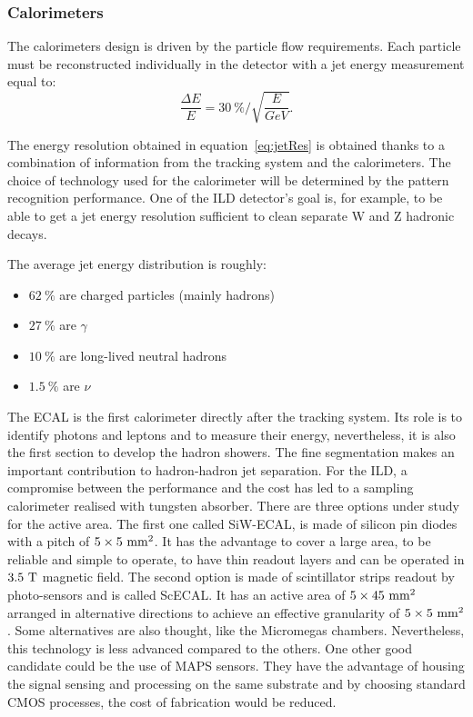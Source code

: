       \subsubsection{Calorimeters}

      The calorimeters design is driven by the particle flow requirements.
      Each particle must be reconstructed individually in the detector with a jet energy measurement equal to:
      \begin{equation}
        \frac{\Delta E}{E} = 30~\% / \sqrt{\frac{E}{GeV}}.
        \label{eq:jetRes}
      \end{equation}

      The energy resolution obtained in equation~\ref{eq:jetRes} is obtained thanks to a combination of information from the tracking system and the calorimeters. 
      The choice of technology used for the calorimeter will be determined by the pattern recognition performance. 
      One of the \gls{ILD} detector's goal is, for example, to be able to get a jet energy resolution sufficient to clean separate W and Z hadronic decays.
      
      The average jet energy distribution is roughly: 
      \begin{itemize}
        \item $62~\%$ are charged particles (mainly hadrons)
        \item $27~\%$ are $\gamma$
        \item $10~\%$ are long-lived neutral hadrons
        \item $1.5~\%$ are $\nu$
      \end{itemize}

      The \gls{ECAL} is the first calorimeter directly after the tracking system.
      Its role is to identify photons and leptons and to measure their energy, nevertheless, it is also the first section to develop the hadron showers.
      The fine segmentation makes an important contribution to hadron-hadron jet separation.
      For the \gls{ILD}, a compromise between the performance and the cost has led to a sampling calorimeter realised with tungsten absorber.
      There are three options under study for the active area.
      The first one called SiW-ECAL, is made of silicon pin diodes with a pitch of $5 \times 5~\rm{mm}^2$. 
      It has the advantage to cover a large area, to be reliable and simple to operate, to have thin readout layers and can be operated in $3.5~\rm{T}$ magnetic field.
      The second option is made of scintillator strips readout by photo-sensors and is called ScECAL.
      It has an active area of $5 \times 45~\rm{mm}^2$ arranged in alternative directions to achieve an effective granularity of $5 \times 5~\rm{mm}^2$. 
      Some alternatives are also thought, like the Micromegas chambers. Nevertheless, this technology is less advanced compared to the others.
      One other good candidate could be the use of \gls{MAPS} sensors.
      They have the advantage of housing the signal sensing and processing on the same  substrate and by choosing standard CMOS processes, the cost of fabrication would be reduced.

